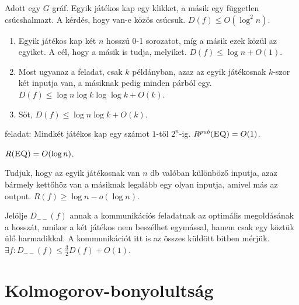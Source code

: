 \begin{Exercise}[counter={sorszam}, difficulty=0]
Adott egy $G$ gráf. Egyik játékos kap egy klikket, a másik egy független csúcshalmazt. A kérdés, hogy van-e közös csúcsuk. $D(f)\leq O(\log^2 n )$.
\end{Exercise}


\begin{Exercise}[counter={sorszam}, difficulty=0]
\begin{enumerate}
 \item Egyik játékos kap két $n$ hosszú 0-1 sorozatot, míg a másik ezek közül az egyiket. A cél, hogy a másik is tudja, melyiket. $D(f)\leq \log n+O(1)$.
 \item \hard Most ugyanaz a feladat, csak $k$ példányban, azaz az egyik játékosnak $k$-szor két inputja van, a másiknak pedig minden párból egy. $D(f)\leq \log n \log k\log \log k+O(k)$.
 \item Sőt, $D(f)\leq \log n \log k+O(k)$.
\end{enumerate}
\end{Exercise}


\begin{Exercise}[counter={sorszam}, difficulty=0]
 feladat: Mindkét játékos kap egy számot $1$-től $2^n$-ig. $R^{pub}(\mbox{\sc{EQ}})=O(1)$.
\end{Exercise}


\begin{Exercise}[counter={sorszam}, difficulty=0]
$R(\mbox{\sc{EQ}})=O(\log n)$.
\end{Exercise}


\begin{Exercise}[counter={sorszam}, difficulty=2]
Tudjuk, hogy az egyik játékosnak van $n$ db valóban különböző inputja, azaz bármely kettőhöz van a másiknak legalább egy olyan inputja, amivel más az output. $R(f)\geq\log n -o(\log n)$.
\end{Exercise}


\begin{Exercise}[counter={sorszam}, difficulty=2]
 Jelölje $D_{--}(f)$ annak a kommunikációs feladatnak az optimális megoldásának a hosszát, amikor a két játékos nem beszélhet egymással, hanem csak egy köztük ülő harmadikkal. A kommunikációt itt is az összes küldött bitben mérjük. $\exists f: D_{--}(f)\leq \frac{3}{2} D(f)+O(1)$.
\end{Exercise}



\chapter{Kolmogorov-bonyolultság}

